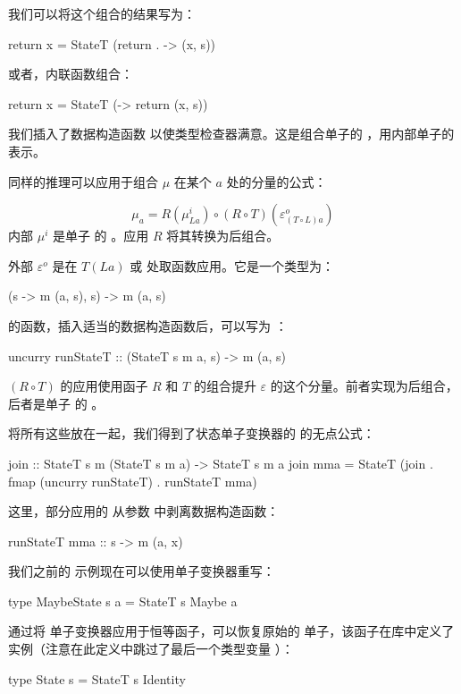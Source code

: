 \documentclass[DaoFP]{subfiles}
\begin{document}
我们可以将这个组合的结果写为：
\begin{haskell}
return x = StateT (return . \s -> (x, s))
\end{haskell}
或者，内联函数组合：
\begin{haskell}
return x = StateT (\s -> return (x, s))
\end{haskell}
我们插入了数据构造函数  以使类型检查器满意。这是组合单子的 ，用内部单子的  表示。

同样的推理可以应用于组合 $\mu$ 在某个 $a$ 处的分量的公式：

\[ \mu_a = R(\mu^i_{L a}) \circ (R \circ T) (\varepsilon^o_{(T\circ L) a})\]
内部 $\mu^i$ 是单子  的 。应用 $R$ 将其转换为后组合。

外部 $\varepsilon^o$ 是在 $T(L a)$ 或  处取函数应用。它是一个类型为：
\begin{haskell}
(s -> m (a, s), s) -> m (a, s)
\end{haskell}
的函数，插入适当的数据构造函数后，可以写为 ：
\begin{haskell}
uncurry runStateT :: (StateT s m a, s) -> m (a, s)
\end{haskell}
$(R \circ T)$ 的应用使用函子 $R$ 和 $T$ 的组合提升 $\varepsilon$ 的这个分量。前者实现为后组合，后者是单子  的 。

将所有这些放在一起，我们得到了状态单子变换器的  的无点公式：
\begin{haskell}
join :: StateT s m (StateT s m a) -> StateT s m a
join mma = StateT (join . fmap (uncurry runStateT) . runStateT mma)
\end{haskell}
这里，部分应用的  从参数  中剥离数据构造函数：
\begin{haskell}
runStateT mma :: s -> m (a, x)
\end{haskell}

我们之前的  示例现在可以使用单子变换器重写：
\begin{haskell}
type MaybeState s a = StateT s Maybe a
\end{haskell}

通过将  单子变换器应用于恒等函子，可以恢复原始的  单子，该函子在库中定义了  实例（注意在此定义中跳过了最后一个类型变量 ）：
\begin{haskell}
type State s = StateT s Identity
\end{haskell}
\end{document}
